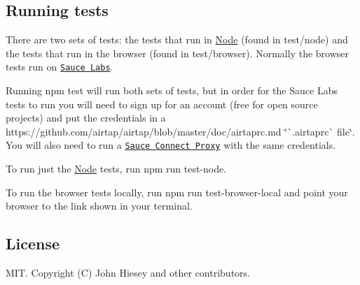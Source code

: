 \subsection*{Running tests}

There are two sets of tests\+: the tests that run in \mbox{\hyperlink{classNode}{Node}} (found in {\ttfamily test/node}) and the tests that run in the browser (found in {\ttfamily test/browser}). Normally the browser tests run on \href{http://saucelabs.com/}{\tt Sauce Labs}.

Running {\ttfamily npm test} will run both sets of tests, but in order for the Sauce Labs tests to run you will need to sign up for an account (free for open source projects) and put the credentials in a https\+://github.com/airtap/airtap/blob/master/doc/airtaprc.\+md \char`\"{}\`{}.\+airtaprc\`{} file\char`\"{}. You will also need to run a \href{https://wiki.saucelabs.com/display/DOCS/Sauce+Connect+Proxy}{\tt Sauce Connect Proxy} with the same credentials.

To run just the \mbox{\hyperlink{classNode}{Node}} tests, run {\ttfamily npm run test-\/node}.

To run the browser tests locally, run {\ttfamily npm run test-\/browser-\/local} and point your browser to the link shown in your terminal.

\subsection*{License}

M\+IT. Copyright (C) John Hiesey and other contributors. 